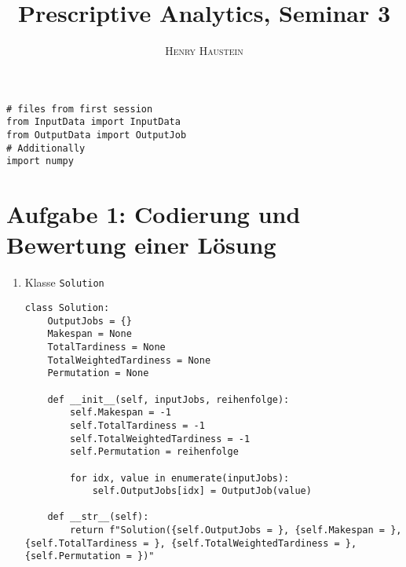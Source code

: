 \documentclass{article}
\title{\textbf{Prescriptive Analytics, Seminar 3}}
\author{\textsc{Henry Haustein}}
\date{}
\begin{document}
	\maketitle
	\begin{lstlisting}
# files from first session
from InputData import InputData
from OutputData import OutputJob
# Additionally
import numpy

	\end{lstlisting}
	\section*{Aufgabe 1: Codierung und Bewertung einer Lösung}
	\begin{enumerate}[label=(\alph*)]
		\item Klasse \texttt{Solution}
		\begin{lstlisting}
class Solution:
	OutputJobs = {}
	Makespan = None
	TotalTardiness = None
	TotalWeightedTardiness = None
	Permutation = None

	def __init__(self, inputJobs, reihenfolge):
		self.Makespan = -1
		self.TotalTardiness = -1
		self.TotalWeightedTardiness = -1
		self.Permutation = reihenfolge

		for idx, value in enumerate(inputJobs):
			self.OutputJobs[idx] = OutputJob(value)

	def __str__(self):
		return f"Solution({self.OutputJobs = }, {self.Makespan = }, {self.TotalTardiness = }, {self.TotalWeightedTardiness = }, {self.Permutation = })"


\end{lstlisting}
\end{enumerate}
\end{document}

